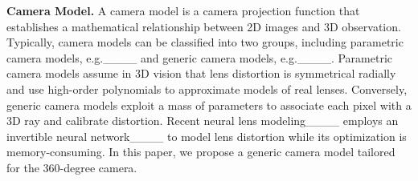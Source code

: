 \textbf{Camera Model.} A camera model is a camera projection function that establishes a mathematical relationship between 2D images and 3D observation. Typically, camera models can be classified into two groups, including parametric camera models, e.g.____ and generic camera models, e.g.____. Parametric camera models assume in 3D vision that lens distortion is symmetrical radially and use high-order polynomials to approximate models of real lenses. Conversely, generic camera models exploit a mass of parameters to associate each pixel with a 3D ray and calibrate distortion. Recent neural lens modeling____ employs an invertible neural network____ to model lens distortion while its optimization is memory-consuming. 
In this paper, we propose a generic camera model tailored for the 360-degree camera.





